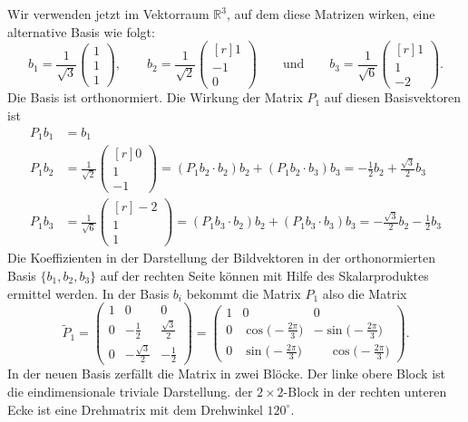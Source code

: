 \begin{beispiel}
Wir verwenden jetzt im Vektorraum $\mathbb{R}^3$, auf dem diese Matrizen
wirken, eine alternative Basis wie folgt:
\[
b_1
=
\frac{1}{\!\sqrt{3}}
\begin{pmatrix}1\\1\\1\end{pmatrix}
,
\qquad
b_2
=
\frac{1}{\!\sqrt{2}}
\begin{pmatrix*}[r]1 \\ -1 \\ 0\end{pmatrix*}
\qquad\text{und}\qquad
b_3
=
\frac{1}{\!\sqrt{6}}
\begin{pmatrix*}[r] 1\\1\\-2\end{pmatrix*}.
\]
Die Basis ist orthonormiert.
Die Wirkung der Matrix $P_1$ auf diesen Basisvektoren ist
\begin{align*}
P_1b_1
&=
b_1\\
P_1b_2
&=
\frac{1}{\!\sqrt{2}}
\begin{pmatrix*}[r]
0\\1\\-1
\end{pmatrix*}
=
(P_1b_2\cdot b_2) b_2
+
(P_1b_2\cdot b_3) b_3
=
-\frac{1}{2}
b_2
+
\frac{\!\sqrt{3}}{2}
b_3
\\
P_1b_3
&=
\frac{1}{\!\sqrt{6}}
\begin{pmatrix*}[r]
-2\\ 1\\1
\end{pmatrix*}
=
(P_1b_3\cdot b_2) b_2
+
(P_1b_3\cdot b_3) b_3
=
-\frac{\!\sqrt{3}}{2}
b_2
-
\frac{1}{2}
b_3
\end{align*}
Die Koeffizienten in der Darstellung der Bildvektoren in der
orthonormierten Basis $\{b_1,b_2,b_3\}$ auf der rechten Seite
können mit Hilfe des Skalarproduktes ermittel werden.
In der Basis $b_i$ bekommt die Matrix $P_1$ also die Matrix
\begin{equation}
\renewcommand{\arraystretch}{1.2}
\tilde{P}_1
=
\begin{pmatrix}
1&0&0\\
0&-\frac12 & \frac{\!\sqrt{3}}2\\
0&-\frac{\!\sqrt{3}}2&-\frac12
\end{pmatrix}
=
\begin{pmatrix}
1&0&0\\
0&\cos\bigl(-\frac{2\pi}{3}\bigr)& -\sin\bigl(-\frac{2\pi}{3}\bigr) \\
0&\sin\bigl(-\frac{2\pi}{3}\bigr)& \phantom{-}\cos\bigl(-\frac{2\pi}{3}\bigr)
\end{pmatrix}.
\label{buch:gruppen:darstellung:bsp:c3:blockform}
\end{equation}
In der neuen Basis zerfällt die Matrix in zwei Blöcke.
Der linke obere Block ist die eindimensionale triviale Darstellung.
der $2\times 2$-Block in der rechten unteren Ecke ist eine Drehmatrix mit
dem Drehwinkel $120^\circ$.


\end{beispiel}
